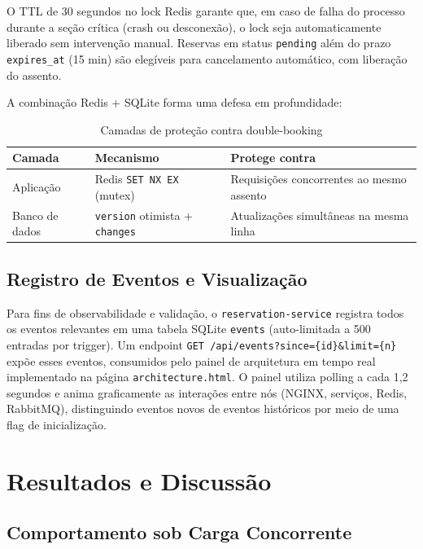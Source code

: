 \documentclass[12pt]{article}
\begin{document}
O TTL de 30 segundos no lock Redis garante que, em caso de falha do processo durante a
seção crítica (crash ou desconexão), o lock seja automaticamente liberado sem intervenção
manual. Reservas em status \texttt{pending} além do prazo \texttt{expires\_at} (15 min)
são elegíveis para cancelamento automático, com liberação do assento.

A combinação Redis + SQLite forma uma defesa em profundidade:

\begin{table}[ht]
\centering
\caption{Camadas de proteção contra double-booking}
\label{tab:layers}
\begin{tabular}{|l|l|l|}
\hline
\textbf{Camada} & \textbf{Mecanismo} & \textbf{Protege contra} \\
\hline
Aplicação & Redis \texttt{SET NX EX} (mutex) & Requisições concorrentes ao mesmo assento \\
\hline
Banco de dados & \texttt{version} otimista + \texttt{changes} & Atualizações simultâneas na mesma linha \\
\hline
\end{tabular}
\end{table}

\subsection{Registro de Eventos e Visualização}

Para fins de observabilidade e validação, o \texttt{reservation-service} registra todos
os eventos relevantes em uma tabela SQLite \texttt{events} (auto-limitada a 500
entradas por trigger). Um endpoint \texttt{GET /api/events?since=\{id\}\&limit=\{n\}}
expõe esses eventos, consumidos pelo painel de arquitetura em tempo real implementado
na página \texttt{architecture.html}. O painel utiliza polling a cada 1,2 segundos e
anima graficamente as interações entre nós (NGINX, serviços, Redis, RabbitMQ),
distinguindo eventos novos de eventos históricos por meio de uma flag de inicialização.


\section{Resultados e Discussão}

\subsection{Comportamento sob Carga Concorrente}
\end{document}

